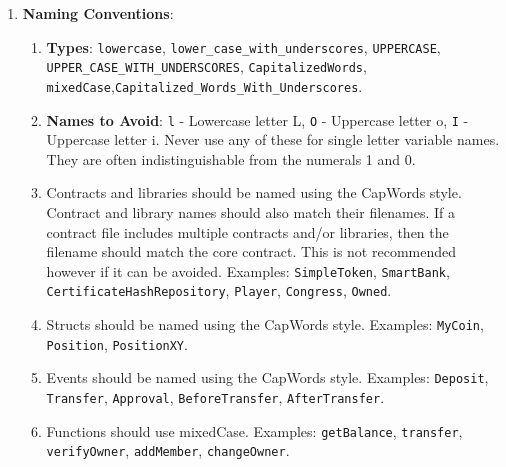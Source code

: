 \begin{enumerate}
\item\textbf{Naming Conventions}:
    \begin{enumerate}
    \item\textbf{Types}: \verb|lowercase|, \verb|lower_case_with_underscores|, \verb|UPPERCASE|, \verb|UPPER_CASE_WITH_UNDERSCORES|, \verb|CapitalizedWords|, \verb|mixedCase|,\linebreak \verb|Capitalized_Words_With_Underscores|.
    \item\textbf{Names to Avoid}: \verb|l| - Lowercase letter L, \verb|O| - Uppercase letter o, \verb|I| - Uppercase letter i. Never use any of these for single letter variable names. They are often indistinguishable from the numerals 1 and 0.
    \item Contracts and libraries should be named using the CapWords style. Contract and library names should also match their filenames. If a contract file includes multiple contracts and/or libraries, then the filename should match the core contract. This is not recommended however if it can be avoided. Examples: \verb|SimpleToken|, \verb|SmartBank|, \verb|CertificateHashRepository|, \verb|Player|, \verb|Congress|, \verb|Owned|.
    \item Structs should be named using the CapWords style. Examples: \verb|MyCoin|, \verb|Position|, \verb|PositionXY|.
    \item Events should be named using the CapWords style. Examples: \verb|Deposit|, \verb|Transfer|, \verb|Approval|, \verb|BeforeTransfer|, \verb|AfterTransfer|.
    \item Functions should use mixedCase. Examples: \verb|getBalance|, \verb|transfer|, \verb|verifyOwner|, \verb|addMember|, \verb|changeOwner|.
    \end{enumerate}


\end{enumerate}
